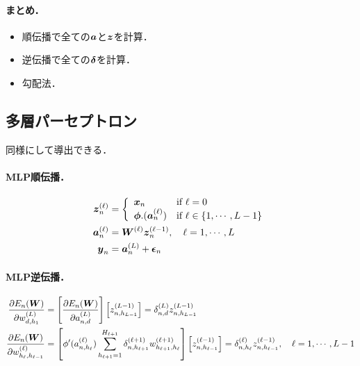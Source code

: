 \paragraph{まとめ．}
\begin{itemize}
\item 順伝播で全ての$\mbox{\boldmath $a$}$と$\mbox{\boldmath $z$}$を計算．
\item 逆伝播で全ての$\mbox{\boldmath $\delta$}$を計算．
\item 勾配法．
\end{itemize}

\subsection{多層パーセプトロン}
同様にして導出できる．
\paragraph{MLP順伝播．}
\begin{align*}
 \mbox{\boldmath $z$}^{(\ell)}_n &=
 \left\{
     \begin{array}{ll}
       \mbox{\boldmath $x$}_n & \mbox{if }\ell=0 \\
       \mbox{\boldmath $\phi$}.(\mbox{\boldmath $a$}^{(\ell)}_n) & \mbox{if }\ell \in \{1,\cdots,L-1 \}
     \end{array}
   \right.
   \\
 \mbox{\boldmath $a$}^{(\ell)}_n &= \mbox{\boldmath $W$}^{(\ell)}\mbox{\boldmath $z$}^{(\ell-1)}_n,~~~\ell=1,\cdots,L
 \\
 \mbox{\boldmath $y$}_n &= \mbox{\boldmath $a$}^{(L)}_n + \mbox{\boldmath $\epsilon$}_n
\end{align*}

\paragraph{MLP逆伝播．}
\begin{align*}
 \frac{\partial E_n(\mbox{\boldmath $W$})}{\partial w^{(L)}_{d,h_1}}
 &=
 \left[ \frac{\partial E_n(\mbox{\boldmath $W$})}{\partial a^{(L)}_{n,d}} \right] \left[ z^{(L-1)}_{n,h_{L-1}}\right]
=\delta^{(L)}_{n,d}z^{(L-1)}_{n,h_{L-1}}
\\
\frac{\partial E_n(\mbox{\boldmath $W$})}{\partial w^{(\ell)}_{h_\ell,h_{\ell-1}}}
&=
\left[
\phi'(a^{(\ell)}_{n,h_\ell}) \sum_{h_{\ell+1}=1}^{H_{\ell+1}}\delta^{(\ell+1)}_{n,h_{\ell+1}} w^{(\ell+1)}_{h_{\ell+1},h_\ell}
\right]
\left[z^{(\ell-1)}_{n,h_{\ell-1}}\right]
=
\delta^{(\ell)}_{n,h_\ell}
z^{(\ell-1)}_{n,h_{\ell-1}}
,~~~\ell=1,\cdots,L-1
\end{align*}
